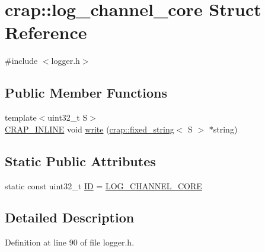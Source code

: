 \hypertarget{structcrap_1_1log__channel__core}{\section{crap\+:\+:log\+\_\+channel\+\_\+core Struct Reference}
\label{structcrap_1_1log__channel__core}
}


{\ttfamily \#include $<$logger.\+h$>$}

\subsection*{Public Member Functions}
\begin{DoxyCompactItemize}
\item 
{\footnotesize template$<$uint32\+\_\+t S$>$ }\\\hyperlink{config__x86_8h_a5a40526b8d842e7ff731509998bb0f1c}{C\+R\+A\+P\+\_\+\+I\+N\+L\+I\+N\+E} void \hyperlink{structcrap_1_1log__channel__core_ac0b2f6125aeff6e6cb4e7d67be3c9c84}{write} (\hyperlink{classcrap_1_1fixed__string}{crap\+::fixed\+\_\+string}$<$ S $>$ $\ast$string)
\end{DoxyCompactItemize}
\subsection*{Static Public Attributes}
\begin{DoxyCompactItemize}
\item 
static const uint32\+\_\+t \hyperlink{structcrap_1_1log__channel__core_a6dbadca4befeb617fd8bc5a1a6b6fc01}{I\+D} = \hyperlink{logger_8h_af8df519e0d93f01f0237a41a093e19f8}{L\+O\+G\+\_\+\+C\+H\+A\+N\+N\+E\+L\+\_\+\+C\+O\+R\+E}
\end{DoxyCompactItemize}


\subsection{Detailed Description}


Definition at line 90 of file logger.\+h.



